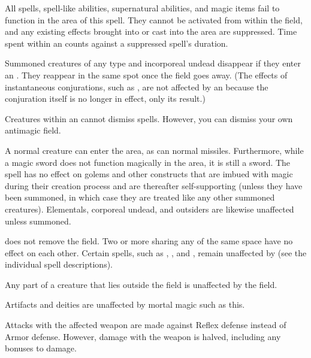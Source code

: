 \spelldur{\durlong \dismissable}
\begin{spelleffect}
    All spells, spell-like abilities, supernatural abilities, and magic items fail to function in the area of this spell. They cannot be activated from within the field, and any existing effects brought into or cast into the area are suppressed. Time spent within an  counts against a suppressed spell's duration.
    \par Summoned creatures of any type and incorporeal undead disappear if they enter an . They reappear in the same spot once the field goes away. (The effects of instantaneous conjurations, such as , are not affected by an  because the conjuration itself is no longer in effect, only its result.)
    \par Creatures within an  cannot dismiss spells. However, you can dismiss your own antimagic field.
\end{spelleffect}
\begin{spellnotes}
    A normal creature can enter the area, as can normal missiles. Furthermore, while a magic sword does not function magically in the area, it is still a sword. The spell has no effect on golems and other constructs that are imbued with magic during their creation process and are thereafter self-supporting (unless they have been summoned, in which case they are treated like any other summoned creatures). Elementals, corporeal undead, and outsiders are likewise unaffected unless summoned.
    \par {} does not remove the field. Two or more  sharing any of the same space have no effect on each other. Certain spells, such as , , and , remain unaffected by  (see the individual spell descriptions).
    \par Any part of a creature that lies outside the field is unaffected by the field.
    \par Artifacts and deities are unaffected by mortal magic such as this. 
\end{spellnotes}

\spelldur{\durshort \dismissable}
\begin{spellsuccess}
    Attacks with the affected weapon are made against Reflex defense instead of Armor defense. However, damage with the weapon is halved, including any bonuses to damage.
\end{spellsuccess}


